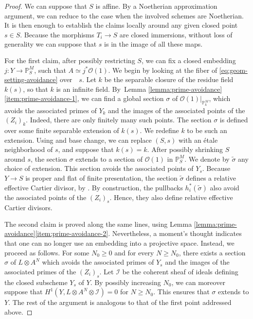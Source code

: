 \documentclass[11pt]{article}
\theoremstyle{plain}
\theoremstyle{definition}
\newcommand{\PBbb}{\mathbb P}
\newcommand{\Ical}{\mathcal I}
\newcommand{\Ocal}{\mathcal O}
\begin{document}
\begin{proof}
We can suppose that $S$ is affine. By a Noetherian approximation argument, we can reduce to the case when the involved schemes are Noetherian. It is then enough to establish the claims locally around any given closed point $s\in S$. Because the morphisms $T_{i}\to S$ are closed immersions, without loss of generality we can suppose that $s$ is in the image of all these maps.

For the first claim, after possibly restricting $S$, we can fix a closed embedding $j\colon Y\to\PBbb^{M}_{S}$, such that $A\simeq j^{\ast}\Ocal(1)$. We begin by looking at the fiber of \eqref{eq:geom-setting-avoidance} over~ $s$. Let $k$ be the separable closure of the residue field $k(s)$, so that $k$ is an infinite field. By~Lemma \ref{lemma:prime-avoidance}\eqref{item:prime-avoidance-1}, we can find a global section $\sigma$ of $\Ocal(1)|_{\PBbb^{M}_{k}}$, which avoids the associated primes of $Y_{k}$ and the images of the associated points of the $(Z_{i})_{k}$. Indeed, there are only finitely many such points. The section $\sigma$ is defined over some finite separable extension of $k(s)$. We redefine $k$ to be such an extension. Using \cite[\href{https://stacks.math.columbia.edu/tag/01ZM}{02LF}]{stacks-project} and base change, we can replace $(S,s)$ with an étale neighborhood of $s$, and suppose that $k(s)=k$. After possibly shrinking $S$ around $s$, the section $\sigma$ extends to a section of $\Ocal(1)$ in $\PBbb^{M}_{S}$. We denote by $\widetilde{\sigma}$ any choice of extension. This section avoids the associated points of $Y_{s}$. Because $Y\to S$ is proper and flat of finite presentation, the section $\widetilde{\sigma}$ defines a relative effective Cartier divisor, by \cite[Prop.\,11.3.7 \& Th.\,11.3.8]{EGAIV3}. By construction, the pullbacks $h_{i}^{\ast}(\widetilde{\sigma})$ also avoid the associated points of the $(Z_{i})_{s}$. Hence, they also define relative effective Cartier divisors.

The second claim is proved along the same lines, using Lemma \ref{lemma:prime-avoidance}\eqref{item:prime-avoidance-2}. Nevertheless, a moment's thought indicates that one can no longer use an embedding into a projective space. Instead, we proceed as follows. For some $N_{0}\geq 0$ and for every $N\geq N_{0}$, there exists a section $\sigma$ of $L\otimes A^{N}$ which avoids the associated primes of $Y_{s}$ and the images of the associated primes of the $(Z_{i})_{s}$. Let $\Ical$ be the coherent sheaf of ideals defining the closed subscheme $Y_{s}$ of $Y$. By possibly increasing $N_{0}$, we can moreover suppose that $H^{1}(Y, L\otimes A^{N}\otimes\Ical)=0$ for $N\geq N_{0}$. This ensures that $\sigma$ extends to $Y$. The rest of the argument is analogous to that of the first point addressed above.
\end{proof}
\end{document}
